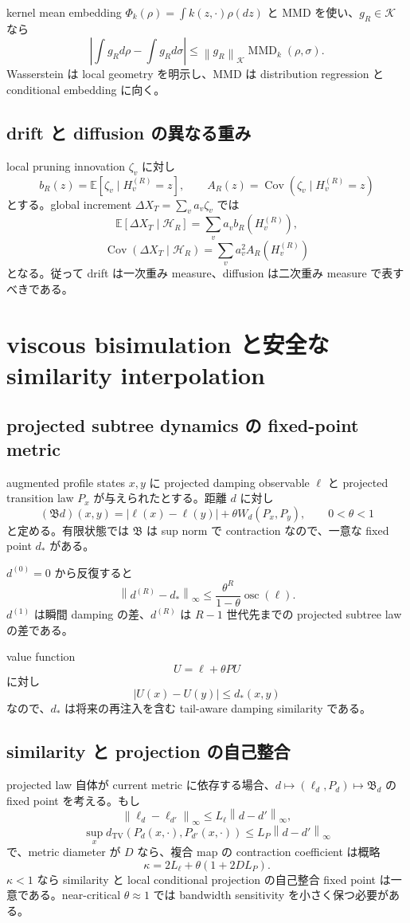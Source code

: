 \documentclass[11pt,a4paper,openany]{book}
\numberwithin{equation}{chapter}
\newcommand{\E}{\mathbb E}
\newcommand{\Cov}{\operatorname{Cov}}
\newcommand{\TV}{d_{\mathrm{TV}}}
\newcommand{\cH}{\mathcal H}
\newcommand{\cK}{\mathcal K}
\newcommand{\osc}{\operatorname{osc}}
\newcommand{\MMD}{\operatorname{MMD}}
\newcommand{\norm}[1]{\left\lVert #1\right\rVert}
\begin{document}
kernel mean embedding $\Phi_k(\rho)=\int k(z,\cdot)\rho(dz)$ と MMD を使い、$g_R\in\cK$ なら
\[
\left|\int g_Rd\rho-\int g_Rd\sigma\right|
\le\norm{g_R}_{\cK}\MMD_k(\rho,\sigma).
\]
Wasserstein は local geometry を明示し、MMD は distribution regression と conditional embedding に向く。

\section{drift と diffusion の異なる重み}
local pruning innovation $\zeta_v$ に対し
\[
b_R(z)=\E[\zeta_v\mid H_v^{(R)}=z],
\qquad
A_R(z)=\Cov(\zeta_v\mid H_v^{(R)}=z)
\]
とする。global increment $\Delta X_T=\sum_va_v\zeta_v$ では
\[
\E[\Delta X_T\mid\cH_R]
=\sum_va_vb_R(H_v^{(R)}),
\]
\[
\Cov(\Delta X_T\mid\cH_R)
=\sum_va_v^2A_R(H_v^{(R)})
\]
となる。従って drift は一次重み measure、diffusion は二次重み measure で表すべきである。

\chapter{viscous bisimulation と安全な similarity interpolation}
\section{projected subtree dynamics の fixed-point metric}
augmented profile states $x,y$ に projected damping observable $\ell$ と projected transition law $P_x$ が与えられたとする。距離 $d$ に対し
\[
(\mathfrak Bd)(x,y)
=|\ell(x)-\ell(y)|+\theta W_d(P_x,P_y),
\qquad 0<\theta<1
\]
と定める。有限状態では $\mathfrak B$ は sup norm で contraction なので、一意な fixed point $d_*$ がある。

$d^{(0)}=0$ から反復すると
\[
\norm{d^{(R)}-d_*}_\infty
\le
\frac{\theta^R}{1-\theta}\osc(\ell).
\]
$d^{(1)}$ は瞬間 damping の差、$d^{(R)}$ は $R-1$ 世代先までの projected subtree law の差である。

value function
\[
U=\ell+\theta PU
\]
に対し
\[
|U(x)-U(y)|\le d_*(x,y)
\]
なので、$d_*$ は将来の再注入を含む tail-aware damping similarity である。

\section{similarity と projection の自己整合}
projected law 自体が current metric に依存する場合、$d\mapsto(\ell_d,P_d)\mapsto\mathfrak B_d$ の fixed point を考える。もし
\[
\norm{\ell_d-\ell_{d'}}_\infty\le L_\ell\norm{d-d'}_\infty,
\]
\[
\sup_x\TV(P_d(x,\cdot),P_{d'}(x,\cdot))
\le L_P\norm{d-d'}_\infty
\]
で、metric diameter が $D$ なら、複合 map の contraction coefficient は概略
\[
\kappa=2L_\ell+\theta(1+2DL_P).
\]
$\kappa<1$ なら similarity と local conditional projection の自己整合 fixed point は一意である。near-critical $\theta\approx1$ では bandwidth sensitivity を小さく保つ必要がある。
\end{document}

